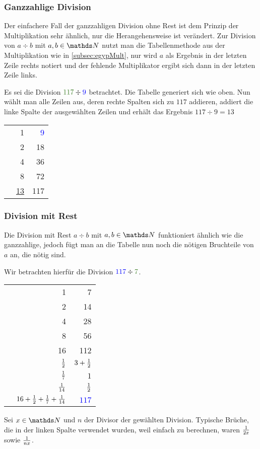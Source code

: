 	\subsubsection{Ganzzahlige Division}
	Der einfachere Fall der ganzzahligen Division ohne Rest ist dem Prinzip der Multiplikation sehr ähnlich, nur die Herangehensweise ist verändert. Zur Division von $a \div b$ mit $a, b \in \N$ nutzt man die Tabellenmethode aus der Multiplikation wie in \ref{subsec:egypMult}, nur wird $a$ als Ergebnis in der letzten Zeile rechts notiert und der fehlende Multiplikator ergibt sich dann in der letzten Zeile links.
	
	\begin{bsp}
		Es sei die Division $\textcolor{OliveGreen}{117} \div \textcolor{blue}{9}$ betrachtet. Die Tabelle generiert sich wie oben. Nun wählt man alle Zeilen aus, deren rechte Spalten sich zu $117$ addieren, addiert die linke Spalte der ausgewählten Zeilen und erhält das Ergebnis $117 \div 9 = 13$
		\begin{center}
			\begin{tabular}{r r r}
				\checkmark & 1 & \textcolor{blue}{9}\\
				& 2 & 18\\
				\checkmark & 4 & 36\\
				\checkmark & 8 & 72\\ \hline
				& \underline{\underline{13}} & \textcolor{OliveGreen}{117}
			\end{tabular}
		\end{center}
	\end{bsp}

	\subsubsection{Division mit Rest}
	Die Division mit Rest $a \div b$ mit $a, b \in \N$ funktioniert ähnlich wie die ganzzahlige, jedoch fügt man an die Tabelle nun noch die nötigen Bruchteile von $a$ an, die nötig sind.
	
	\begin{bsp}
		Wir betrachten hierfür die Division $\textcolor{blue}{117} \div \textcolor{OliveGreen}{7}$.
		\begin{center}
			\begin{tabular}{r r r}
				& 1 & \textcolor{OliveGreen}{7}\\
				& 2 & 14\\
				& 4 & 28\\
				& 8 & 56\\
				\checkmark & 16 & 112\\
				\checkmark & $\frac{1}{2}$ & $3+\frac{1}{2}$\\
				\checkmark & $\frac{1}{7}$ & $1$\\
				\checkmark & $\frac{1}{14}$ & $\frac{1}{2}$\\ \hline
				& \underline{\underline{$16+\frac{1}{2}+\frac{1}{7}+\frac{1}{14}$}} & \textcolor{blue}{$117$}
			\end{tabular}
		\end{center}
	\end{bsp}
	Sei $x \in \N$ und $n$ der Divisor der gewählten Division. Typische Brüche, die in der linken Spalte verwendet wurden, weil einfach zu berechnen, waren $\frac{1}{2x}$ sowie $\frac{1}{nx}$.
	
